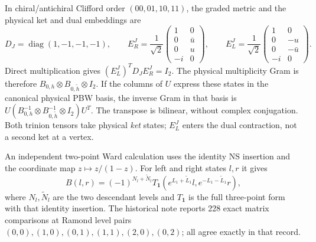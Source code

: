 In chiral/antichiral Clifford order $(00,01,10,11)$, the graded
metric and the physical ket and dual embeddings are
\begin{equation}
 D_J=\operatorname{diag}(1,-1,-1,-1),\qquad
 E_R^J=\frac1{\sqrt2}
 \begin{pmatrix}1&0\\0&\bar u\\0&u\\-i&0\end{pmatrix},\qquad
 E_L^J=\frac1{\sqrt2}
 \begin{pmatrix}1&0\\0&-u\\0&-\bar u\\-i&0\end{pmatrix}.
 \label{eq:partition-embeddings}
\end{equation}
Direct multiplication gives $(E_L^J)^TD_JE_R^J=I_2$.
The physical multiplicity Gram is therefore
$B_{0,h}\otimes B_{0,\tilde h}\otimes I_2$.
If the columns of $U$ express these states in the canonical physical
PBW basis, the inverse Gram in that basis is
$U(B_{0,h}^{-1}\otimes B_{0,\tilde h}^{-1}\otimes I_2)U^T$.
The transpose is bilinear, without complex conjugation.
Both trinion tensors take physical \emph{ket} states; $E_L^J$
enters the dual contraction, not a second ket at a vertex.

An independent two-point Ward calculation uses the identity NS
insertion and the coordinate map $z\mapsto z/(1-z)$. For left and
right states $l,r$ it gives
\begin{equation}
 B(l,r)=(-1)^{N_l+\widetilde N_l}
 T_{\mathbf1}\!\left(e^{L_1+\widetilde L_1}l,
                     e^{-L_1-\widetilde L_1}r\right),
 \label{eq:partition-identity-pairing}
\end{equation}
where $N_l,\widetilde N_l$ are the two descendant levels and
$T_{\mathbf1}$ is the full three-point form with that identity
insertion. The historical note reports 228 exact matrix comparisons at
Ramond level pairs $(0,0),(1,0),(0,1),(1,1),(2,0),(0,2)$;
all agree exactly in that record.

